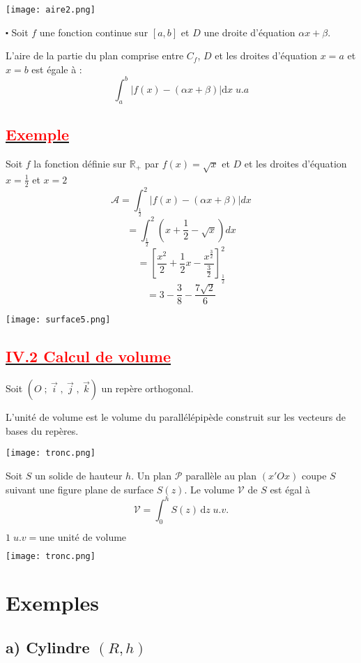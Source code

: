 \documentclass[12pt]{article}
\begin{document}
    \texttt{[image: aire2.png]}


$\centerdot$ Soit $f$ une fonction continue sur $[a, b]$ et $D$ une droite d'équation $\alpha x + \beta.$

L'aire de la partie du plan comprise entre $C_{f}$, $D$ et les droites d'équation $x=a$ et $x=b$ est égale à :
$$\int_{a}^{b}|f(x)-(\alpha x+\beta)|\mathrm{d}x\;u.a$$

\subsection*{\underline{\textbf{\textcolor{red}{Exemple }}}}
Soit $f$ la fonction définie sur $\mathbb{R}_{+}$ par $f(x)=\sqrt{x}$ et $D$ et les droites d'équation $x=\frac{1}{2}$ et $x=2$ 
\[\mathcal{A}=\int_{\frac{1}{2}}^{2}|f(x)-(\alpha x+\beta)|dx\]
\[=\int_{\frac{1}{2}}^{2}(x+\frac{1}{2}-\sqrt{x})dx\]
\[= \left[ \frac{x^{2}}{2}+\frac{1}{2}x-\frac{x^{\frac{3}{2}}}{\frac{3}{2}} \right]_{\frac{1}{2}}^{2}  \]
\[=3-\frac{3}{8}-\frac{7\sqrt{2}}{6}\]
\begin{center}
    \texttt{[image: surface5.png]}
\end{center}
\subsection*{\underline{\textbf{\textcolor{red}{IV.2 Calcul de volume}}}}
Soit $(O\;;\ \vec{i}\;,\ \vec{j}\;,\ \vec{k})$ un repère orthogonal.

L'unité de volume est le volume du parallélépipède construit sur les vecteurs de bases du repères.
\begin{center}
    \texttt{[image: tronc.png]}
\end{center}
Soit $S$ un solide de hauteur $h$. Un plan $\mathcal{P}$ parallèle au plan $(x'Ox)$ coupe $S$ suivant une figure plane de surface $S(z)$. Le volume $\mathcal{V}$ de $S$ est égal à 
$$\mathcal{V}=\int_{0}^{h} S(z) \, \mathrm{d}z \; u.v.$$

$1\;u.v = \text{une unité de volume}$

\begin{center}
    \texttt{[image: tronc.png]}
\end{center}

\section*{Exemples}

\subsection*{a) Cylindre $(R, h)$}
\end{document}
